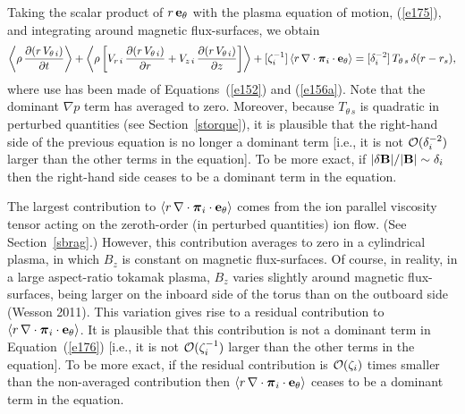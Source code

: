 \documentclass[notitlepage,12pt]{article}
\newcommand{\bpi}{\mbox{\boldmath$\pi$}}
\begin{document}
Taking  the scalar product of $r\,{\bf e}_\theta$ with the plasma equation of motion, (\ref{e175}), and integrating around magnetic
flux-surfaces, we obtain 
\begin{equation}\label{e176}
\left\langle\rho\,\frac{\partial (r\,V_{\theta\,i})}{\partial t} \right\rangle 
+\left\langle \rho\left[V_{r\,i}\,\frac{\partial (r\,V_{\theta\,i})}{\partial r} + V_{z\,i}\,\frac{\partial(r\, V_{\theta\,i})}{\partial z}
\right]\right\rangle + [\zeta_i^{-1}]\,\langle r\,\nabla\cdot \bpi_i\cdot{\bf e}_\theta\rangle
= [\delta_i^{-2}]\,T_{\theta\,s}\,\delta(r-r_s),
\end{equation}
where use has been made of Equations~(\ref{e152}) and (\ref{e156a}). Note that the dominant $\nabla p$ term
has averaged to zero. Moreover, because $T_{\theta\,s}$ is quadratic in perturbed quantities (see Section~\ref{storque}), it is plausible that the right-hand side of the previous equation is no longer a dominant term [i.e., it is not ${\cal O}(\delta_i^{-2})$ larger than the
other terms in the equation]. To be more exact, if $|\delta {\bf B}|/|{\bf B}|\sim \delta_i$ then the right-hand side ceases to be a dominant term in the equation. 

The largest contribution to $\langle r\,\nabla\cdot \bpi_i\cdot{\bf e}_\theta\rangle$
comes from the ion parallel viscosity tensor acting on the zeroth-order (in perturbed quantities) ion flow. (See Section~\ref{sbrag}.)  However, this contribution averages to zero in a cylindrical plasma, in which $B_z$
is constant on magnetic flux-surfaces. Of course, in reality, in a large aspect-ratio tokamak plasma, 
$B_z$ varies slightly around magnetic flux-surfaces, being larger on the inboard side of the torus than on the outboard side (Wesson 2011). This variation gives rise to a residual contribution to $\langle r\,\nabla\cdot \bpi_i\cdot{\bf e}_\theta\rangle$.
It is plausible that this contribution is not a dominant term in Equation~(\ref{e176})  [i.e., it is not ${\cal O}(\zeta_i^{-1})$ larger than the
other terms in the equation]. To be more exact, if the residual contribution is ${\cal O}(\zeta_i)$ times smaller than the non-averaged  contribution then  $\langle r\,\nabla\cdot \bpi_i\cdot{\bf e}_\theta\rangle$ ceases to be a dominant term in the equation.
\end{document}
